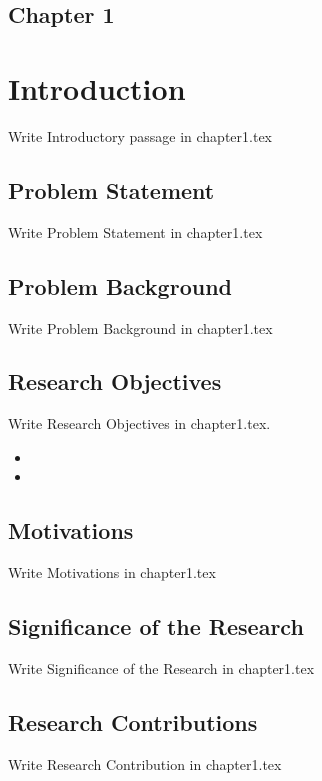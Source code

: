 \begin{center}
    \section*{\fontsize{20}{20}\selectfont Chapter 1}
\end{center}
\vspace{10mm}
\section{Introduction}

Write Introductory passage in chapter1.tex


\subsection{Problem Statement}
Write Problem Statement in chapter1.tex

\subsection{Problem Background}
Write Problem Background in chapter1.tex

\subsection{Research Objectives}
Write Research Objectives in chapter1.tex.

 \begin{itemize}
    \item 
    \item 
 \end{itemize}


 
\subsection{Motivations}
Write Motivations in chapter1.tex


\subsection{Significance of the Research}
Write Significance of the Research in chapter1.tex

\subsection{Research Contributions}
Write Research Contribution in chapter1.tex

